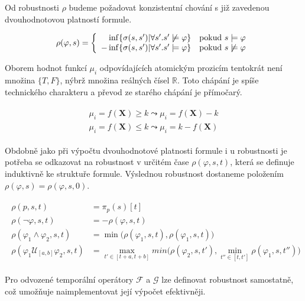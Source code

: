 Od robustnosti $\rho$ budeme požadovat konzistentní chování s již zavedenou dvouhodnotovou platností
formule. 

\begin{align}\label{eq:signal:distance}
\rho(\varphi, s) = \left\{\begin{array}{r@{\quad}c}
\inf\{\sigma(s, s') | \forall s'. s' \not\models \varphi \}	& \textrm{pokud } s \models \varphi	\\
- \inf\{\sigma(s, s') | \forall s'. s' \models \varphi \}	& \textrm{pokud } s \not\models \varphi
\end{array} \right.
\end{align}

Oborem hodnot funkcí $\mu_i$ odpovídajících atomickým prozicím tentokrát není množina $\{T, F\}$,
nýbrž množina reálných čísel $\mathbb{R}$. Toto chápání je spíše technického charakteru a převod
ze starého chápání je přímočarý.

\begin{align}\label{eq:stl:semantics}
\begin{array}{ll}
\mu_i = f(\mathbf{X}) \geq k		\leadsto \mu_i = f(\mathbf{X}) - k							\\
\mu_i = f(\mathbf{X}) \leq k		\leadsto \mu_i = k - f(\mathbf{X})
\end{array}
\end{align}

Obdobně jako při výpočtu dvouhodnotové platnosti formule i u robustnosti je potřeba se odkazovat
na robustnost v určitém čase $\rho(\varphi, s, t)$, která se definuje induktivně ke struktuře
formule. Výslednou robustnost dostaneme položením $\rho(\varphi, s) = \rho(\varphi, s, 0)$.

\begin{align}\label{eq:stl:semantics}
\begin{array}{ll}
\rho(p, s, t)											&= \pi_p(s)[t]											\\
\rho(\neg\varphi, s, t)									&= - \rho(\varphi, s, t)								\\
\rho(\varphi_1 \wedge \varphi_2, s, t)					&= \min\Big(\rho(\varphi_1, s, t), \rho(\varphi_1, s, t)\Big)	\\
\rho(\varphi_1 \mathcal{U}_{[a, b]} \varphi_2, s, t)	&= {\displaystyle \max_{t' \in [t + a, t + b]}} min\Big(\rho(\varphi_2, s, t'), {\displaystyle\min_{t'' \in [t, t']}}\rho(\varphi_1, s, t'')\Big)
\end{array}
\end{align}

Pro odvozené temporální operátory $\mathcal{F}$ a $\mathcal{G}$ lze definovat robustnost
samostatně, což umožňuje naimplementovat její výpočet efektivněji.

